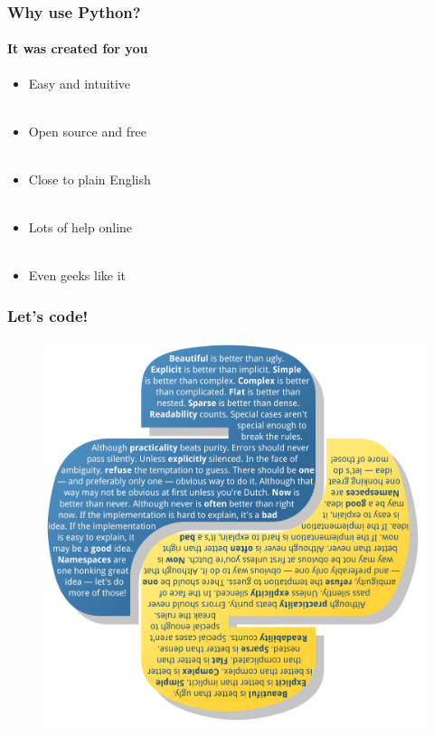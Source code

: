 \documentclass{beamer}
\begin{document}
\begin{frame}
\frametitle{Why use Python?}
\framesubtitle{It was created for you}
\large

\begin{itemize}

 \item Easy and intuitive \\ \
 \item  Open source and free \\ \

 \item Close to plain English \\ \
 \item Lots of help online \\ \

\item Even geeks like it

\end{itemize}
\end{frame}

\begin{frame}
\frametitle{Let's code!}



\begin{figure}

\includegraphics[scale=0.3]{zen.pdf}
\end{figure}
\end{frame}
\end{document}
